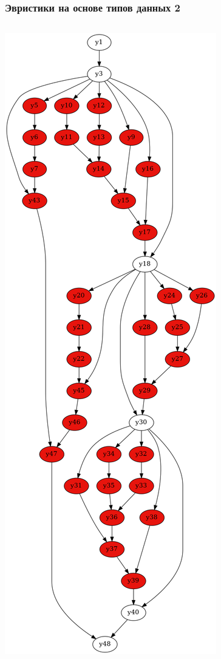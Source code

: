 \documentclass{beamer}
\begin{document}
\begin{frame}\frametitle{Эвристики на основе типов данных 2}
  \begin{columns}
  \includegraphics[width=\textwidth]{hash2if4.png}

\end{columns}
\end{frame}
\end{document}
